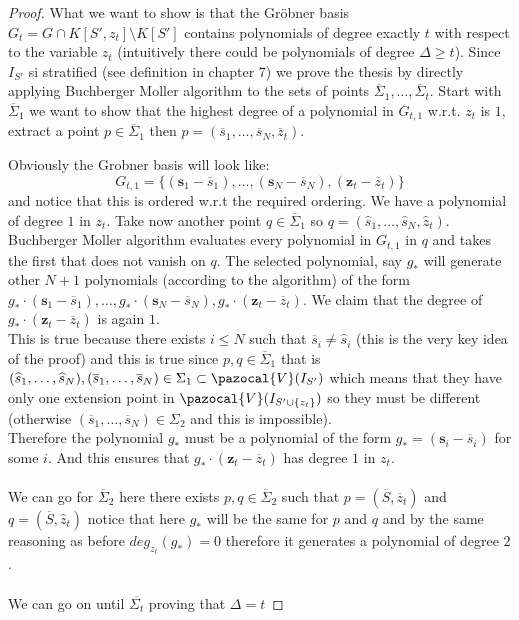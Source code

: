 \documentclass[11pt,a4paper]{report}
\theoremstyle{plain}
\theoremstyle{definition}
\newcommand{\V}{\pazocal{V}}
\begin{document}
\begin{lem-hand}[5.3]
\end{lem-hand}
\begin{proof}
	What we want to show is that the Gr\"obner basis $G_t = G \cap K[S',z_t]\setminus K[S']$	contains polynomials of degree exactly $t$ with respect to the variable $z_t$ (intuitively there could be polynomials of degree $\Delta \ge t$).
	Since $I_{S'}$ si stratified (see definition in chapter 7) we prove the thesis by directly applying Buchberger Moller algorithm to the sets of points $\overline{\Sigma}_1,\ldots,\overline{\Sigma}_t$.
	Start with $\overline{\Sigma}_1$ we want to show that the highest degree of a polynomial in $G_{t,1}$ w.r.t. $z_t$ is $1$, extract a point $p \in \overline{\Sigma}_1$ then $p = (\overline{s}_1,\ldots,\overline{s}_N,\overline{z}_t)$. 
	
	Obviously the Grobner basis will look like:
	\[
	G_{t,1} = \{(\textbf{s}_1 - \overline{s}_1),\ldots,(\textbf{s}_N - \overline{s}_N), (\textbf{z}_t - \overline{z}_t)\}
	\]
	and notice that this is ordered w.r.t the required ordering.
	We have a polynomial of degree $1$ in $z_t$. Take now another point $q \in \overline{\Sigma}_1$ so $q = (\widehat{s}_1,\ldots,\widehat{s}_N, \widehat{z}_t)$. Buchberger Moller algorithm evaluates every polynomial in $G_{t,1}$ in $q$ and takes the first that does not vanish on $q$. The selected polynomial, say $g_*$ will generate other $N+1$ polynomials (according to the algorithm) of the form $g_*\cdot(\textbf{s}_1 - \overline{s}_1),\ldots,g_*\cdot(\textbf{s}_N - \overline{s}_N),g_*\cdot(\textbf{z}_t - \overline{z}_t)$. We claim that the degree of $g_*\cdot(\textbf{z}_t - \overline{z}_t)$ is again $1$.\\
	This is true because there exists $i \le N$ such that $\overline{s}_i \ne \widehat{s}_i$ (this is the very key idea of the proof) and this is true since $p,q \in \overline{\Sigma}_1$ that is \\$(\widehat{s}_1,\ldots,\widehat{s}_N), (\overline{s}_1,\ldots,\overline{s}_N) \in \Sigma_1 \subset \V(I_{S'})$ which means that they have only one extension point in $\V(I_{S' \cup \{z_t\}})$ so they must be different (otherwise $(\overline{s}_1,\ldots,\overline{s}_N) \in \Sigma_2$ and this is impossible).\\
	Therefore the polynomial $g_*$ must be a polynomial of the form $g_* = (\textbf{s}_i - \overline{s}_i)$ for some $i$. And this ensures that $g_*\cdot(\textbf{z}_t - \overline{z}_t)$ has degree $1$ in $z_t$.\\\\
	We can go for $\overline{\Sigma}_2$ here there exists $p,q \in \overline{\Sigma}_2$ such that $p = (\overline{S},\overline{z}_t)$ and $q = (\overline{S},\widehat{z}_t)$ notice that here $g_*$ will be the same for $p$ and $q$ and by the same reasoning as before $deg_{z_t}(g_*) = 0$ therefore it generates a polynomial of degree $2$.\\\\
	We can go on until $\overline{\Sigma_t}$ proving that $\Delta = t$
\end{proof}
\end{document}
